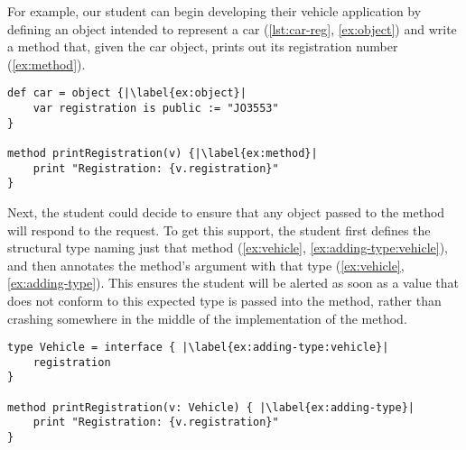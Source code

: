 For example, our student can begin developing their vehicle
application by defining an object intended to represent a car
(\cref{lst:car-reg}, \cref{ex:object}) and write a method that, given
the car object, prints out its registration number (\cref{ex:method}).

\begin{lstlisting}[caption={The start of a simple program for tracking vehicle information.},float,label=lst:car-reg,escapechar=|,columns=flexible]
def car = object {|\label{ex:object}|
    var registration is public := "JO3553"
}

method printRegistration(v) {|\label{ex:method}|
    print "Registration: {v.registration}"
}
\end{lstlisting}

Next, the student could decide to ensure that any object passed to the
 method will respond to the
 request.  To get this support, the student first
defines the structural type \citep{theCleanVehicle}
naming just that method (\cref{ex:vehicle},
\cref{ex:adding-type:vehicle}), and then annotates the
 method's argument with that type
(\cref{ex:vehicle}, \cref{ex:adding-type}). This ensures the student
will be alerted as soon as a value that does not conform to this
expected type is passed into the  method,
rather than crashing somewhere in the middle of the
implementation of the  method.


\begin{lstlisting}[label={ex:vehicle},caption={Adding a type annotation to a method parameter.},escapechar=|,columns=flexible]
type Vehicle = interface { |\label{ex:adding-type:vehicle}|
    registration    
}

method printRegistration(v: Vehicle) { |\label{ex:adding-type}|
    print "Registration: {v.registration}"
}
\end{lstlisting}



